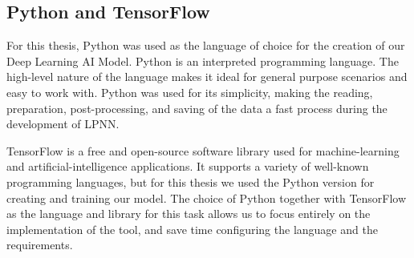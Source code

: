 \subsection{Python and TensorFlow}
For this thesis, Python was used as the language of choice for the creation of our Deep Learning AI Model. Python is an interpreted programming language. The high-level nature of the language makes it ideal for general purpose scenarios and easy to work with. Python was used for its simplicity, making the reading, preparation, post-processing, and saving of the data a fast process during the development of LPNN.\newline

TensorFlow is a free and open-source software library used for machine-learning and artificial-intelligence applications. It supports a variety of well-known programming languages, but for this thesis we used the Python version for creating and training our model. The choice of Python together with TensorFlow as the language and library for this task allows us to focus entirely on the implementation of the tool, and save time configuring the language and the requirements.
